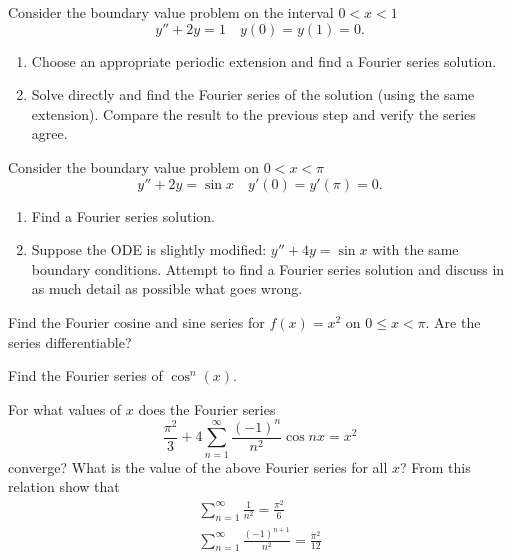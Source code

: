 {\begin{Exercise}
  Consider the boundary value problem on the interval $0 < x < 1$
  \[
  y'' + 2 y = 1 \quad y(0) = y(1) = 0.
  \]
  \begin{enumerate}
  \item 
    Choose an appropriate periodic extension and find a Fourier series solution.
  \item 
    Solve directly and find the Fourier series of the solution (using the
    same extension). Compare the result to the previous step and verify the 
    series agree.
  \end{enumerate}
\end{Exercise}






\begin{Exercise}
  Consider the boundary value problem on $0 < x < \pi$
  \[ 
  y'' + 2 y = \sin{x} \quad y'(0) = y'(\pi) = 0.
  \]
  \begin{enumerate} 
  \item 
    Find a Fourier series solution. 
  \item 
    Suppose the ODE is slightly modified: $y'' + 4 y = \sin{x}$
    with the same boundary conditions. 
    Attempt to find a Fourier series solution and discuss in as much detail as
    possible what goes wrong. 
  \end{enumerate}
\end{Exercise}








\begin{Exercise}
  Find the Fourier cosine and sine series for $f(x) = x^2$ on $0 \leq x < \pi$.
  Are the series differentiable?
\end{Exercise}



\begin{Exercise}
  Find the Fourier series of $\cos^n(x)$.
\end{Exercise}




\begin{Exercise}
  For what values of $x$ does the Fourier series
  \[
  \frac{\pi^2}{3} + 4 \sum_{n=1}^\infty \frac{(-1)^n}{n^2} \cos nx = x^2
  \]
  converge?  What is the value of the above Fourier series for all $x$? 
  From this relation show that
  \begin{gather*}
    \sum_{n = 1}^\infty \frac{1}{n^2} = \frac{\pi^2}{6} \\
    \sum_{n = 1}^\infty \frac{(-1)^{n+1}}{n^2} = \frac{\pi^2}{12}
  \end{gather*}
\end{Exercise}







}

